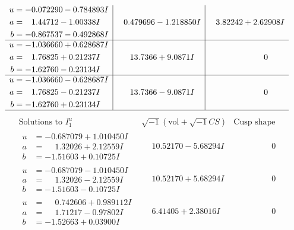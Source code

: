 \documentclass[1p]{elsarticle_modified}
\theoremstyle{definition}
\newcommand{\I}{\sqrt{-1}}
\begin{document}
$$\begin{array}{c|c|c}
\begin{aligned}
u &= -0.072290 - 0.784893 I \\
a &= \phantom{-}1.44712 - 1.00338 I \\
b &= -0.867537 - 0.492868 I\end{aligned}
 & \phantom{-}0.479696 - 1.218850 I & \phantom{-}3.82242 + 2.62908 I \\ \hline\begin{aligned}
u &= -1.036660 + 0.628687 I \\
a &= \phantom{-}1.76825 + 0.21237 I \\
b &= -1.62760 - 0.23134 I\end{aligned}
 & \phantom{-}13.7366 + 9.0871 I & \phantom{-0.000000 } 0 \\ \hline\begin{aligned}
u &= -1.036660 - 0.628687 I \\
a &= \phantom{-}1.76825 - 0.21237 I \\
b &= -1.62760 + 0.23134 I\end{aligned}
 & \phantom{-}13.7366 - 9.0871 I & \phantom{-0.000000 } 0\\
 \hline 
 \end{array}$$\newpage$$\begin{array}{c|c|c}  
\text{Solutions to }I^u_{1}& \I (\text{vol} + \sqrt{-1}CS) & \text{Cusp shape}\\
 \hline 
\begin{aligned}
u &= -0.687079 + 1.010450 I \\
a &= \phantom{-}1.32026 + 2.12559 I \\
b &= -1.51603 + 0.10725 I\end{aligned}
 & \phantom{-}10.52170 - 5.68294 I & \phantom{-0.000000 } 0 \\ \hline\begin{aligned}
u &= -0.687079 - 1.010450 I \\
a &= \phantom{-}1.32026 - 2.12559 I \\
b &= -1.51603 - 0.10725 I\end{aligned}
 & \phantom{-}10.52170 + 5.68294 I & \phantom{-0.000000 } 0 \\ \hline\begin{aligned}
u &= \phantom{-}0.742606 + 0.989112 I \\
a &= \phantom{-}1.71217 - 0.97802 I \\
b &= -1.52663 + 0.03900 I\end{aligned}
 & \phantom{-}6.41405 + 2.38016 I & \phantom{-0.000000 } 0 \\ \hline\begin{aligned}

\end{aligned}
\end{array}$$
\end{document}
